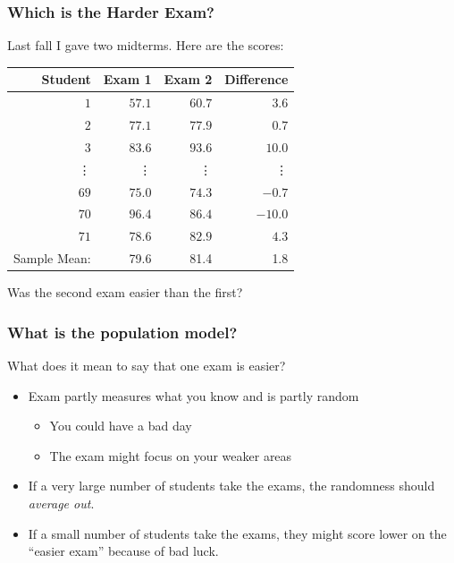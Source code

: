 \begin{frame}
\frametitle{Which is the Harder Exam?}
Last fall I gave two midterms. Here are the scores:
%
\begin{table}[!tbp]
\begin{center}
\begin{tabular}{rrrr}
\hline\hline
\multicolumn{1}{r}{Student}&\multicolumn{1}{r}{Exam 1}&\multicolumn{1}{r}{Exam 2}&\multicolumn{1}{r}{Difference}\tabularnewline
\hline
$ 1$&$57.1$&$60.7$&$  3.6$\tabularnewline
$ 2$&$77.1$&$77.9$&$  0.7$\tabularnewline
$ 3$&$83.6$&$93.6$&$ 10.0$\tabularnewline
\vdots&\vdots&\vdots&\vdots\\
$69$&$75.0$&$74.3$&$ -0.7$\tabularnewline
$70$&$96.4$&$86.4$&$-10.0$\tabularnewline
$71$&$78.6$&$82.9$&$  4.3$\tabularnewline
\hline
Sample Mean: & 79.6 & 81.4  &1.8\\
\hline
\end{tabular}
\end{center}
\end{table}

\alert{Was the second exam easier than the first?}
\end{frame}
\begin{frame}
\frametitle{What is the population model?}

\begin{block}{What does it mean to say that one exam is easier?} 
	\begin{itemize}
	\item Exam partly measures what you know and is partly random 
		\begin{itemize}
			\item You could have a bad day
			\item The exam might focus on your weaker areas
		\end{itemize}
	\item If a very large number of students take the exams, the randomness should \emph{average out}.
		\item If a small number of students take the exams, they might score lower on the ``easier exam'' because of bad luck.
	\end{itemize}
\end{block}




 \end{frame}


